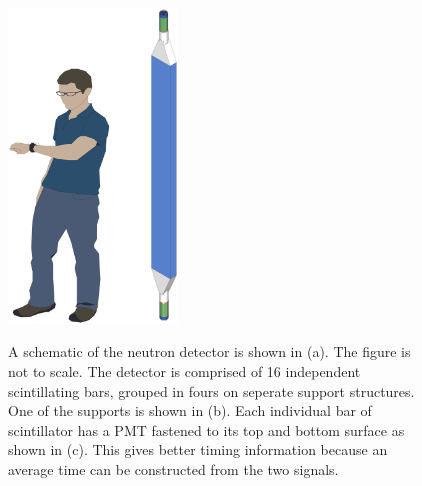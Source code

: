 \begin{figure}[htp]
{	\includegraphics[width=0.4\textwidth]{figures/oneNeutronDetector_person_crop.eps}
}
\label{fig:detectorGeometry}
\caption{A schematic of the neutron detector is shown in (a).  The figure is not to scale.  The detector is comprised of 16 independent scintillating bars, grouped in fours on seperate support structures.  One of the supports is shown in (b).  Each individual bar of scintillator has a PMT fastened to its top and bottom surface as shown in (c).  This gives better timing information because an average time can be constructed from the two signals.}
\end{figure}

